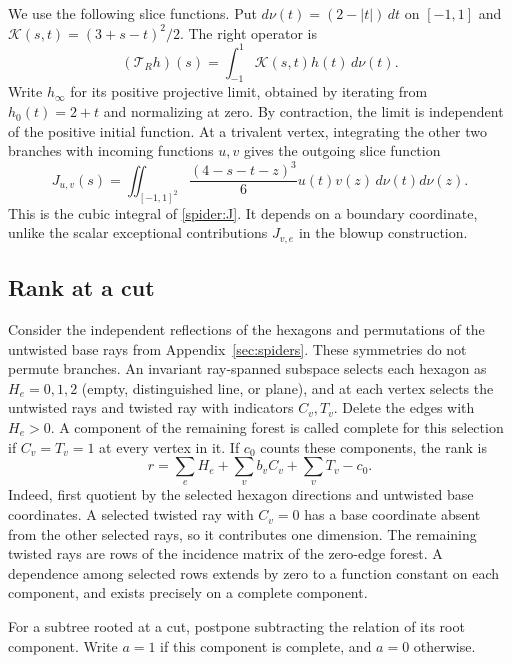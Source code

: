 We use the following slice functions. Put
$d\nu(t)=(2-|t|)\,dt$ on $[-1,1]$ and
$\mathcal K(s,t)=(3+s-t)^2/2$. The right operator is
\[
 (\mathcal T_Rh)(s)=\int_{-1}^1\mathcal K(s,t)h(t)\,d\nu(t).
\]
Write $h_\infty$ for its positive projective limit, obtained by iterating
from $h_0(t)=2+t$ and normalizing at zero. By contraction, the limit is
independent of the positive initial function. At a trivalent vertex,
integrating the other two branches with incoming
functions $u,v$ gives the outgoing slice function
\[
 J_{u,v}(s)=\iint_{[-1,1]^2}\frac{(4-s-t-z)^3}{6}
                       u(t)v(z)\,d\nu(t)d\nu(z).
\]
This is the cubic integral of \eqref{spider:J}. It depends on a boundary
coordinate, unlike the scalar exceptional contributions
$J_{v,e}$ in the blowup construction.

\subsection{Rank at a cut}
Consider the independent reflections of the hexagons and permutations of
the untwisted base rays from Appendix~\ref{sec:spiders}. These symmetries
do not permute branches. An invariant
ray-spanned subspace selects each hexagon as $H_e=0,1,2$ (empty,
distinguished line, or plane), and at each vertex selects the untwisted
rays and twisted ray with indicators $C_v,T_v$. Delete the edges with
$H_e>0$. A component of the remaining forest is called complete for this
selection if $C_v=T_v=1$ at every vertex in it. If $c_0$ counts these
components, the rank is
\begin{equation}\label{tree:rank}
 r=\sum_e H_e+\sum_v b_vC_v+\sum_vT_v-c_0.
\end{equation}
Indeed, first quotient by the selected hexagon directions and untwisted
base coordinates. A selected twisted ray with $C_v=0$ has a base
coordinate absent from the other selected rays, so it contributes one
dimension. The remaining twisted
rays are rows of the incidence matrix of the zero-edge forest. A
dependence among selected rows extends by zero to a function constant
on each component, and exists precisely on a complete component.

For a subtree rooted at a cut, postpone subtracting the relation of its
root component. Write $a=1$ if this component is complete, and $a=0$
otherwise.

